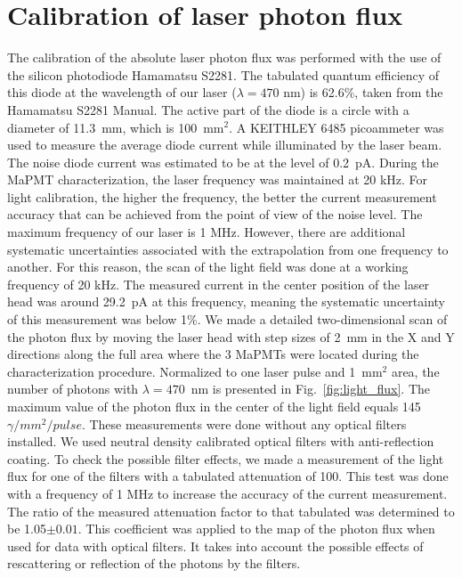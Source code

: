 \section{Calibration of laser photon flux}

The calibration of the absolute laser photon flux was performed with the use of the silicon photodiode Hamamatsu S2281.
The tabulated quantum efficiency of this diode at the wavelength of our laser ($\lambda=470$ nm) is 62.6\%, taken from the Hamamatsu S2281 Manual. 
The active part of the diode is a circle with a diameter of 11.3~mm, which is 100~mm$^2$. 
A KEITHLEY 6485 picoammeter was used to measure the average diode current while illuminated by the laser beam.
The noise diode current was estimated to be at the level of 0.2~pA. 
During the MaPMT characterization, the laser frequency was maintained at 20 kHz. 
For light calibration, the higher the frequency, the better the current measurement accuracy that can be achieved from the point of view of the noise level. 
The maximum frequency of our laser is 1 MHz.
However, there are additional systematic uncertainties associated with the extrapolation from one frequency to another. 
For this reason, the scan of the light field was done at a working frequency of 20 kHz. 
The measured current in the center position of the laser head was around 29.2~pA at this frequency, meaning the systematic uncertainty
of this measurement was below 1\%.  We made a detailed two-dimensional scan of the photon flux by
moving the laser head with step sizes of 2~mm in the X and Y directions along the full area where the 3 MaPMTs were located during the characterization procedure.
Normalized to one laser pulse and 1~mm$^2$ area, the number of photons with $\lambda=470$~nm  is presented in Fig.~\ref{fig:light_flux}.
The maximum value of the photon flux in the center of the light field equals 145 $\gamma/mm^2/pulse$.
These measurements were done without  any optical filters installed. We used neutral density calibrated optical filters with anti-reflection coating.
To check the possible filter effects, we made a measurement of the light flux for one of the filters with a tabulated attenuation of 100. 
This test was done with a frequency of 1 MHz to increase the accuracy of the current measurement. 
The ratio of the measured attenuation factor to that tabulated was determined to be 1.05$\pm 0.01$. This coefficient was applied to the map of the photon flux when used for data with optical filters. It takes into account the possible effects of rescattering or reflection of the photons by the filters.
